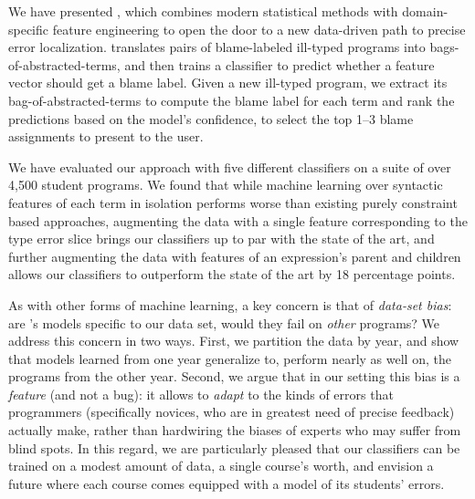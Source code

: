 \label{sec:conclusion}

We have presented \toolname, which
combines modern statistical methods
with domain-specific feature engineering
to open the door to a new data-driven
path to precise error localization.
%
\toolname
translates pairs of
blame-labeled ill-typed
programs into bags-of-abstracted-terms,
and then trains a classifier
to predict whether a feature vector
should get a blame label.
%
Given a new ill-typed program,
we extract its bag-of-abstracted-terms
to compute the blame label for each
term and rank the predictions based
on the model's confidence, to select
the top 1--3 blame assignments to
present to the user.

We have evaluated our approach with
five different classifiers on a suite
of over 4,500 student programs.
%
We found that while machine learning
over syntactic features of each term in isolation
performs worse than existing
purely constraint based approaches, %
augmenting the data with a single feature corresponding to
the type error slice brings our
classifiers up to par with the state of the art,
and further augmenting the data with
features of an expression's parent and children
allows our classifiers to outperform
the state of the art by 18 percentage points.



As with other forms of machine learning,
a key concern is that of \emph{data-set bias}: are
\toolname's models specific
to our data set, would they fail on
\emph{other} programs?
%
We address this concern in two ways.
%
First, we partition the data by year,
and show that models learned from one
year generalize to, \ie perform nearly
as well on, the programs from the other
year.
%
Second, we argue that in our setting
this bias is a \emph{feature} (and not
a bug): it allows \toolname to \emph{adapt}
to the kinds of errors that programmers
(specifically novices, who are in greatest
need of precise feedback) actually make,
rather than hardwiring the biases of
experts who %
may suffer from blind spots. %
%
In this regard, we are particularly pleased
that our classifiers can be trained on a
modest amount of data, \ie a single course's
worth, and envision a future where each course
comes equipped with a model of its students' errors.



